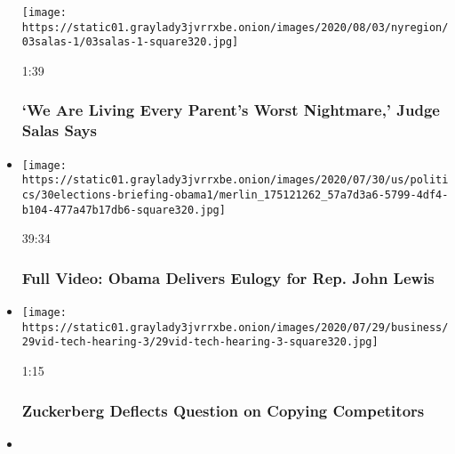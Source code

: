 \begin{itemize}
  \texttt{[image: https://static01.graylady3jvrrxbe.onion/images/2020/08/03/nyregion/03salas-1/03salas-1-square320.jpg]}

  1:39

  \hypertarget{we-are-living-every-parents-worst-nightmare-judge-salas-says}{%
  \subsubsection{`We Are Living Every Parent's Worst Nightmare,' Judge
  Salas
  Says}\label{we-are-living-every-parents-worst-nightmare-judge-salas-says}}
\item
  \href{https://www.nytimes3xbfgragh.onion/video/us/100000007264733/obama-john-lewis-funeral.html?action=click\&module=video-series-bar\&region=header\&pgtype=Article\&playlistId=video/u-s}{}

  \texttt{[image: https://static01.graylady3jvrrxbe.onion/images/2020/07/30/us/politics/30elections-briefing-obama1/merlin\_175121262\_57a7d3a6-5799-4df4-b104-477a47b17db6-square320.jpg]}

  39:34

  \hypertarget{full-video-obama-delivers-eulogy-for-rep-john-lewis}{%
  \subsubsection{Full Video: Obama Delivers Eulogy for Rep. John
  Lewis}\label{full-video-obama-delivers-eulogy-for-rep-john-lewis}}
\item
  \href{https://www.nytimes3xbfgragh.onion/video/us/politics/100000007263272/zuckerberg-jayapal-facebook.html?action=click\&module=video-series-bar\&region=header\&pgtype=Article\&playlistId=video/u-s}{}

  \texttt{[image: https://static01.graylady3jvrrxbe.onion/images/2020/07/29/business/29vid-tech-hearing-3/29vid-tech-hearing-3-square320.jpg]}

  1:15

  \hypertarget{zuckerberg-deflects-question-on-copying-competitors}{%
  \subsubsection{Zuckerberg Deflects Question on Copying
  Competitors}\label{zuckerberg-deflects-question-on-copying-competitors}}
\item
  \href{https://www.nytimes3xbfgragh.onion/video/us/100000007263183/bezos-amazon-predatory-practices.html?action=click\&module=video-series-bar\&region=header\&pgtype=Article\&playlistId=video/u-s}{}


\end{itemize}
